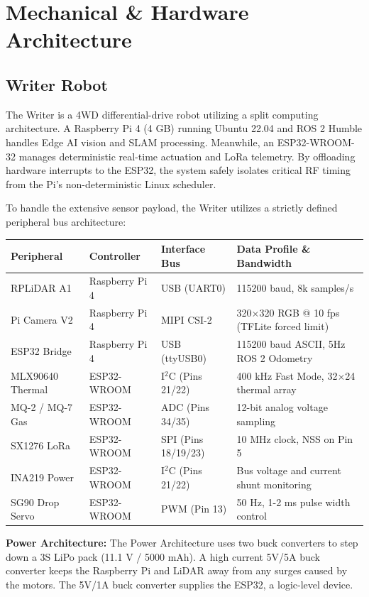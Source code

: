 \documentclass[10pt, letterpaper]{article}
\begin{document}
\section{Mechanical \& Hardware Architecture}

\subsection{Writer Robot}

The Writer is a 4WD differential-drive robot utilizing a split computing architecture. A Raspberry Pi 4 (4 GB) running Ubuntu 22.04 and ROS 2 Humble handles Edge AI vision and SLAM processing. Meanwhile, an ESP32-WROOM-32 manages deterministic real-time actuation and LoRa telemetry. By offloading hardware interrupts to the ESP32, the system safely isolates critical RF timing from the Pi's non-deterministic Linux scheduler.

To handle the extensive sensor payload, the Writer utilizes a strictly defined peripheral bus architecture:

\begin{center}
\footnotesize
\begin{tabularx}{\textwidth}{@{}l l l X@{}}
\toprule
\textbf{Peripheral} & \textbf{Controller} & \textbf{Interface Bus} & \textbf{Data Profile \& Bandwidth} \\
\midrule
RPLiDAR A1 & Raspberry Pi 4 & USB (UART0) & 115200 baud, 8k samples/s \\
Pi Camera V2 & Raspberry Pi 4 & MIPI CSI-2 & 320$\times$320 RGB @ 10 fps (TFLite forced limit) \\
ESP32 Bridge & Raspberry Pi 4 & USB (ttyUSB0) & 115200 baud ASCII, 5Hz ROS 2 Odometry \\
MLX90640 Thermal & ESP32-WROOM & I$^2$C (Pins 21/22) & 400 kHz Fast Mode, 32$\times$24 thermal array \\
MQ-2 / MQ-7 Gas & ESP32-WROOM & ADC (Pins 34/35) & 12-bit analog voltage sampling \\
SX1276 LoRa & ESP32-WROOM & SPI (Pins 18/19/23) & 10 MHz clock, NSS on Pin 5 \\
INA219 Power & ESP32-WROOM & I$^2$C (Pins 21/22) & Bus voltage and current shunt monitoring \\
SG90 Drop Servo & ESP32-WROOM & PWM (Pin 13) & 50 Hz, 1-2 ms pulse width control \\
\bottomrule
\end{tabularx}
\end{center}

\textbf{Power Architecture:} The Power Architecture uses two buck converters to step down a 3S LiPo pack (11.1 V / 5000 mAh).
A high current 5V/5A buck converter keeps the Raspberry Pi and LiDAR away from any surges caused by the motors.
The 5V/1A buck converter supplies the ESP32, a logic-level device.
\end{document}
